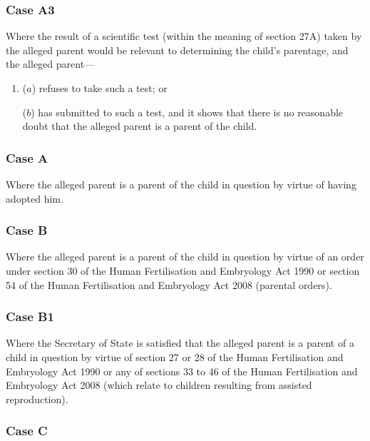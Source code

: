 \documentclass[12pt,a4paper]{article}
\begin{document}
\subsubsection*{Case A3}

Where the result of a scientific test (within the meaning of section 27A) taken by the alleged parent would be relevant to determining the child’s parentage, and the alleged parent---
\begin{enumerate}\item[]
($a$)
refuses to take such a test; or

($b$)
has submitted to such a test, and it shows that there is no reasonable doubt that the alleged parent is a parent of the child.
\end{enumerate}

\subsubsection*{Case A}

Where the alleged parent is a parent of the child in question by virtue of having adopted him.

\subsubsection*{Case B}

Where the alleged parent is a parent of the child in question by virtue of an order under section 30 of the Human Fertilisation and Embryology Act 1990 or section 54 of the Human Fertilisation and Embryology Act 2008 (parental orders).

\subsubsection*{Case B1}

Where the Secretary of State is satisfied that the alleged parent is a parent of a child in question by virtue of section 27 or 28 of the Human Fertilisation and Embryology Act 1990 or any of sections 33 to 46 of the Human Fertilisation and Embryology Act 2008 (which relate to children resulting from assisted reproduction).

\subsubsection*{Case C}
\end{document}
